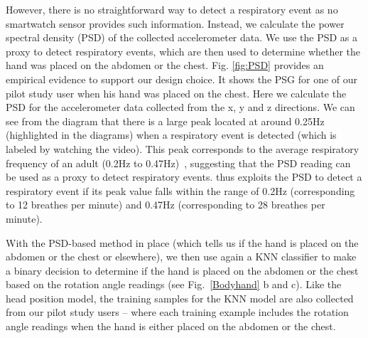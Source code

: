 However, there is no straightforward way to detect a respiratory event as no smartwatch sensor provides such information. Instead, we
calculate the power spectral density (PSD) of the collected accelerometer data. We use the PSD as a proxy to detect respiratory events,
which are then used to determine whether the hand was placed on the abdomen or the chest. Fig. \ref{fig:PSD} provides an empirical evidence
to support our design choice. It shows the PSG for one of our pilot study user when his hand was placed on the chest. Here we calculate the
PSD for the accelerometer data collected from the x, y and z directions. We can see from the diagram that there is a large peak located at
around 0.25Hz (highlighted in the diagrams) when a respiratory event is detected (which is labeled by watching the video). This peak
corresponds to the average respiratory frequency of an adult (0.2Hz to 0.47Hz)~\cite{Breath_frequence}, suggesting that the PSD reading can
be used as a proxy to detect respiratory events. \systemname thus exploits the PSD to detect a respiratory event if its peak value falls
within the range of 0.2Hz (corresponding to 12 breathes per minute) and 0.47Hz (corresponding to 28 breathes per minute).

With the PSD-based method in place (which tells us if the hand is placed on the abdomen or the chest or elsewhere), we then use again a KNN
classifier to make a binary decision to determine if the hand is placed on the abdomen or the chest based on the rotation angle readings
(see Fig.~\ref{Bodyhand} b and c). Like the head position model, the training samples for the KNN model are also collected from our pilot
study users -- where each training example includes the rotation angle readings when the hand is either placed on the abdomen or the chest.

